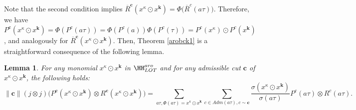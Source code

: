 \documentclass[a4paper,11pt]{article}
\newtheorem{lemma}[theorem]{Lemma}
\begin{document}
Note that the second condition implies $\overline{R}^{\mathbf c}(x^{\kappa}\odot x^{\mathbf k})=\Phi\big( \overline{R}^{c}(a\tau)\big)$. Therefore, we have $P^{\mathbf c}(x^{\kappa}\odot x^{\mathbf k})=\Phi(P^c(a\tau))=\Phi(P^c(a))\Phi(P^c(\tau))= P^c(x^{\kappa})\odot P^c(x^{\mathbf k})$, and analogously for $\overline{R}^{\mathbf c}(x^{\kappa}\odot x^{\mathbf k})$. Then, Theorem \ref{arobck1} is a straightforward consequence of the following lemma.
\begin{lemma}\label{aroj}
For any monomial $x^{\kappa}\odot x^{\mathbf k}$ in $\mathcal \HH_{LOT}^{aro}$ and for any admissible cut $\mathbf c$ of $x^{\kappa}\odot x^{\mathbf k}$, the following holds:
\begin{equation}\label{cojembedding}
\| \mathbf c\|(j\otimes j)\big( P^{\mathbf c}(x^{\kappa}\odot x^{\mathbf k})\otimes R^{\mathbf c}(x^{\kappa}\odot x^{\mathbf k})\big)=\sum_{a\tau, \Phi(a\tau)=x^{\kappa}\odot x^{\mathbf k}}\sum_{c\in Adm(a\tau), c \sim \mathbf c}\frac{\sigma(x^{\kappa}\odot x^{\mathbf k})}{\sigma(a\tau)}P^{c}(a\tau)\otimes R^{c}(a\tau).
\end{equation}
\end{lemma}
\end{document}

